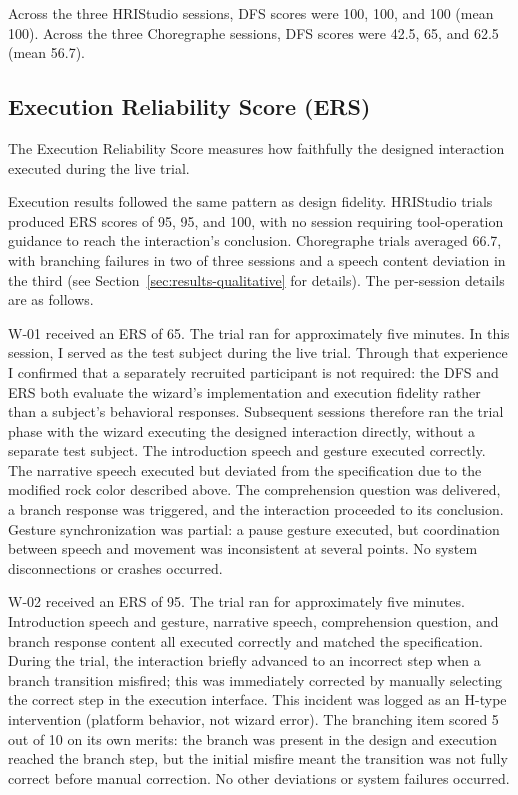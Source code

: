 Across the three HRIStudio sessions, DFS scores were 100, 100, and 100 (mean 100). Across the three Choregraphe sessions, DFS scores were 42.5, 65, and 62.5 (mean 56.7).

\subsection{Execution Reliability Score (ERS)}

The Execution Reliability Score measures how faithfully the designed interaction executed during the live trial.

Execution results followed the same pattern as design fidelity. HRIStudio trials produced ERS scores of 95, 95, and 100, with no session requiring tool-operation guidance to reach the interaction's conclusion. Choregraphe trials averaged 66.7, with branching failures in two of three sessions and a speech content deviation in the third (see Section~\ref{sec:results-qualitative} for details). The per-session details are as follows.

W-01 received an ERS of 65. The trial ran for approximately five minutes. In this session, I served as the test subject during the live trial. Through that experience I confirmed that a separately recruited participant is not required: the DFS and ERS both evaluate the wizard's implementation and execution fidelity rather than a subject's behavioral responses. Subsequent sessions therefore ran the trial phase with the wizard executing the designed interaction directly, without a separate test subject. The introduction speech and gesture executed correctly. The narrative speech executed but deviated from the specification due to the modified rock color described above. The comprehension question was delivered, a branch response was triggered, and the interaction proceeded to its conclusion. Gesture synchronization was partial: a pause gesture executed, but coordination between speech and movement was inconsistent at several points. No system disconnections or crashes occurred.

W-02 received an ERS of 95. The trial ran for approximately five minutes. Introduction speech and gesture, narrative speech, comprehension question, and branch response content all executed correctly and matched the specification. During the trial, the interaction briefly advanced to an incorrect step when a branch transition misfired; this was immediately corrected by manually selecting the correct step in the execution interface. This incident was logged as an H-type intervention (platform behavior, not wizard error). The branching item scored 5 out of 10 on its own merits: the branch was present in the design and execution reached the branch step, but the initial misfire meant the transition was not fully correct before manual correction. No other deviations or system failures occurred.

